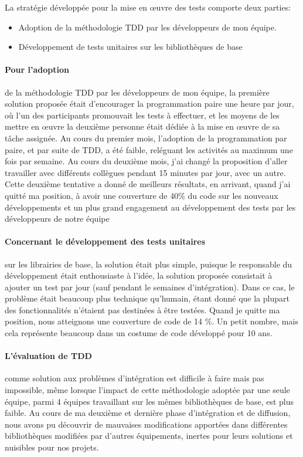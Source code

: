 \documentclass{resume} %
\begin{document}
La stratégie développée pour la mise en œuvre des tests comporte deux parties:
\begin {itemize}
\item Adoption de la méthodologie TDD par les développeurs de mon équipe.
\item Développement de tests unitaires sur les bibliothèques de base
\end {itemize}

\paragraph {Pour l'adoption} de la méthodologie TDD par les développeurs de mon équipe, la première solution proposée était d'encourager la programmation paire une heure par jour, où l'un des participants promouvait les tests à effectuer, et les moyens de les mettre en œuvre la deuxième personne était dédiée à la mise en œuvre de sa tâche assignée.
Au cours du premier mois, l'adoption de la programmation par paire, et par suite de TDD, a été faible, reléguant les activités au maximum une fois par semaine.
Au cours du deuxième mois, j'ai changé la proposition d'aller travailler avec différents collègues pendant 15 minutes par jour, avec un autre.
Cette deuxième tentative a donné de meilleurs résultats, en arrivant, quand j'ai quitté ma position, à avoir une couverture de 40\% du code sur les nouveaux développements et un plus grand engagement au développement des tests par les développeurs de notre équipe

\paragraph {Concernant le développement des tests unitaires} sur les librairies de base, la solution était plus simple, puisque le responsable du développement était enthousiaste à l'idée, la solution proposée consistait à ajouter un test par jour (sauf pendant le semaines d'intégration).
Dans ce cas, le problème était beaucoup plus technique qu'humain, étant donné que la plupart des fonctionnalités n'étaient pas destinées à être testées.
Quand je quitte ma position, nous atteignons une couverture de code de 14 \%. Un petit nombre, mais cela représente beaucoup dans un costume de code développé pour 10 ans.

\paragraph {L'évaluation de TDD} comme solution aux problèmes d'intégration est difficile à faire mais pas impossible, même lorsque l'impact de cette méthodologie adoptée par une seule équipe, parmi 4 équipes travaillant sur les mêmes bibliothèques de base, est plus faible. Au cours de ma deuxième et dernière phase d'intégration et de diffusion, nous avons pu découvrir de mauvaises modifications apportées dans différentes bibliothèques modifiées par d'autres équipements, inertes pour leurs solutions et nuisibles pour nos projets.
\end{document}
